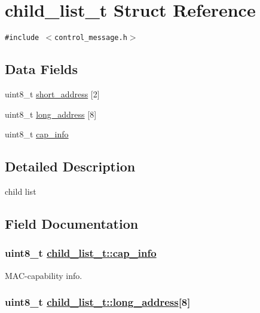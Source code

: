 \hypertarget{structchild__list__t}{
\section{child\_\-list\_\-t Struct Reference}
\label{structchild__list__t}
}
{\tt \#include $<$control\_\-message.h$>$}

\subsection*{Data Fields}
\begin{CompactItemize}
\item 
uint8\_\-t \hyperlink{structchild__list__t_95377fd3af74baa4bd3661116613c44c}{short\_\-address} \mbox{[}2\mbox{]}
\item 
uint8\_\-t \hyperlink{structchild__list__t_bd39cf9facb1035b5f79193bbd3c08f1}{long\_\-address} \mbox{[}8\mbox{]}
\item 
uint8\_\-t \hyperlink{structchild__list__t_0f6ec7849ddbac1784c58ec17e645cc5}{cap\_\-info}
\end{CompactItemize}


\subsection{Detailed Description}
child list 



\subsection{Field Documentation}
\hypertarget{structchild__list__t_0f6ec7849ddbac1784c58ec17e645cc5}{
\subsubsection[cap\_\-info]{\setlength{\rightskip}{0pt plus 5cm}uint8\_\-t \hyperlink{structchild__list__t_0f6ec7849ddbac1784c58ec17e645cc5}{child\_\-list\_\-t::cap\_\-info}}}
\label{structchild__list__t_0f6ec7849ddbac1784c58ec17e645cc5}


MAC-capability info. \hypertarget{structchild__list__t_bd39cf9facb1035b5f79193bbd3c08f1}{
\subsubsection[long\_\-address]{\setlength{\rightskip}{0pt plus 5cm}uint8\_\-t \hyperlink{structchild__list__t_bd39cf9facb1035b5f79193bbd3c08f1}{child\_\-list\_\-t::long\_\-address}\mbox{[}8\mbox{]}}}
\label{structchild__list__t_bd39cf9facb1035b5f79193bbd3c08f1}


